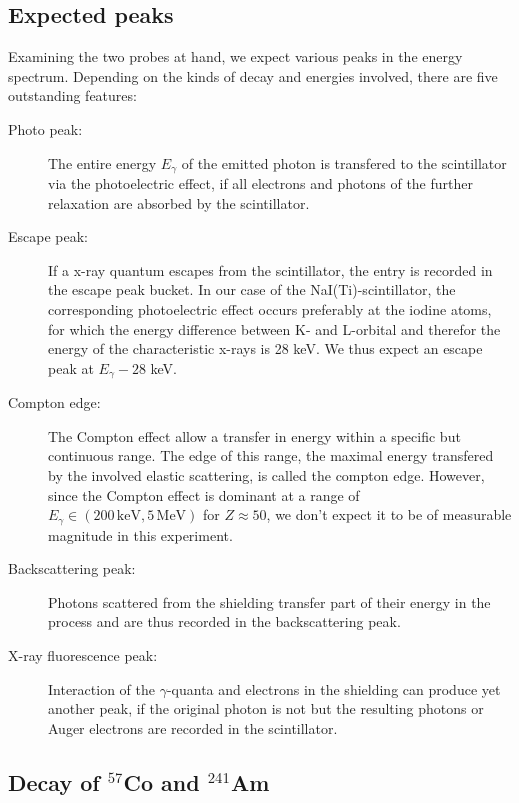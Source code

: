 \subsection{Expected peaks}
Examining the two probes at hand, we expect various peaks in the energy spectrum. 
Depending on the kinds of decay and energies involved, there are five outstanding features:~\cite{ver}
\begin{description}
    \item [Photo peak:] 
        The entire energy $E_\gamma$ of the emitted photon is transfered to the scintillator 
        via the photoelectric effect, if all electrons and photons of the further relaxation are 
        absorbed by the scintillator.
    \item [Escape peak:] 
        If a x-ray quantum escapes from the scintillator, the entry is recorded in the 
        escape peak bucket. In our case of the NaI(Ti)-scintillator, the corresponding photoelectric 
        effect occurs preferably at the iodine atoms, for which the energy difference between K- and L-orbital 
        and therefor the energy of the characteristic x-rays is 28 keV. We thus expect an escape peak 
        at $E_\gamma - 28$ keV. 
    \item [Compton edge:] 
        The Compton effect allow a transfer in energy within a specific but continuous range. 
        The edge of this range, the maximal energy transfered by the involved elastic scattering, 
        is called the compton edge. However, since the Compton effect is dominant at a range of 
        $E_\gamma \in (200\, \mathrm{keV}, 5\, \mathrm{MeV})$ for $Z \approx 50$, we don't expect it to be of 
        measurable magnitude in this experiment. 
    \item [Backscattering peak:] 
        Photons scattered from the shielding transfer part of their energy in the process 
        and are thus recorded in the backscattering peak. 
    \item [X-ray fluorescence peak:] 
        Interaction of the $\gamma$-quanta and electrons in the shielding can produce 
        yet another peak, if the original photon is not but the resulting photons or 
        Auger electrons are recorded in the scintillator. 
\end{description}

\subsection{Decay of $^{57}$Co and $^{241}$Am}
